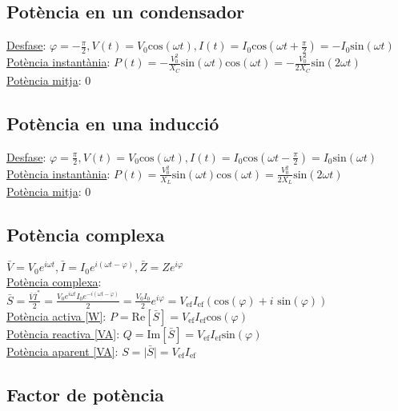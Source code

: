 \documentclass[12pt]{article}
\begin{document}
\begin{multicols}{5}
\subsection{Potència en un condensador}

\underline{Desfase}: $\varphi = -\frac{\pi}{2}, V(t) = V_0\text{cos}(\omega t), I(t) = I_0\text{cos}(\omega t + \frac{\pi}{2}) = -I_0\text{sin}(\omega t)$ \\
\underline{Potència instantània}: $P(t) = -\frac{V_0^2}{X_C}\text{sin}(\omega t)\text{cos}(\omega t) = -\frac{V_0^2}{2X_C}\text{sin}(2\omega t)$ \\
\underline{Potència mitja}: 0

\subsection{Potència en una inducció}

\underline{Desfase}: $\varphi = \frac{\pi}{2}, V(t) = V_0\text{cos}(\omega t), I(t) = I_0\text{cos}(\omega t - \frac{\pi}{2}) = I_0\text{sin}(\omega t)$ \\
\underline{Potència instantània}: $P(t) = \frac{V_0^2}{X_L}\text{sin}(\omega t)\text{cos}(\omega t) = \frac{V_0^2}{2X_L}\text{sin}(2\omega t)$ \\
\underline{Potència mitja}: 0

\subsection{Potència complexa}

$\bar{V} = V_0e^{i\omega t}, \bar{I} = I_0e^{i(\omega t - \varphi)}, \bar{Z} = Z e^{i\varphi}$ \\
\underline{Potència complexa}: $\bar{S} = \frac{\bar{V}\bar{I}^*}{2} = \frac{V_0e^{i\omega t}I_0e^{-i(\omega t - \varphi)}}{2} = \frac{V_0I_0}{2}e^{i\varphi} = V_{\text{ef}}I_{\text{ef}}(\text{cos}(\varphi) + i\text{ sin}(\varphi))$ \\
\underline{Potència activa [W]}: $P = \text{Re}[\bar{S}] = V_{\text{ef}}I_{\text{ef}}\text{cos}(\varphi)$ \\
\underline{Potència reactiva [VA]}: $Q = \text{Im}[\bar{S}] = V_{\text{ef}}I_{\text{ef}}\text{sin}(\varphi)$ \\
\underline{Potència aparent [VA]}: $S = \vert \bar{S} \vert = V_{\text{ef}}I_{\text{ef}}$

\subsection{Factor de potència}


\end{multicols}
\end{document}
